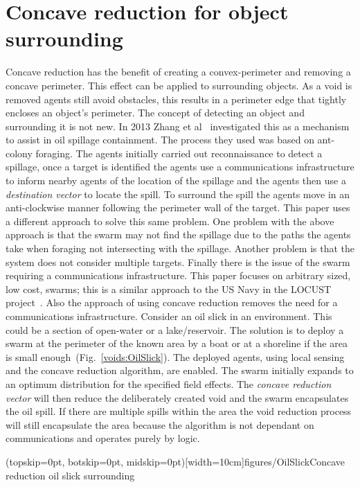 \documentclass{ieeeaccess}
\begin{document}
\section{Concave reduction for object surrounding}\label{voids:ObjectSurrounding}
Concave reduction has the benefit of creating a convex-perimeter and removing a concave perimeter. This effect can be applied to surrounding objects. As a void is removed agents still avoid obstacles, this results in a perimeter edge that tightly encloses an object's perimeter. The concept of detecting an object and surrounding it is not new. In 2013 Zhang et al~\cite{ZFG:13} investigated this as a mechanism to assist in oil spillage containment. The process they used was based on ant-colony foraging. The agents initially carried out reconnaissance to detect a spillage, once a target is identified the agents use a communications infrastructure to inform nearby agents of the location of the spillage and the agents then use a \textit{destination vector} to locate the spill. To surround the spill the agents move in an anti-clockwise manner following the perimeter wall of the target. This paper uses a different approach to solve this same problem.
One problem with the above approach is that the swarm may not find the spillage due to the paths the agents take when foraging not intersecting with the spillage. Another problem is that the system does not consider multiple targets. Finally there is the issue of the swarm requiring a communications infrastructure. 
This paper focuses on arbitrary sized, low cost, swarms; this is a similar approach to the US Navy in the LOCUST project~\cite{MW:15, DS:15}. Also the approach of using concave reduction removes the need for a communications infrastructure. 
Consider an oil slick in an environment. This could be a section of open-water or a lake/reservoir. The solution is to deploy a swarm at the perimeter of the known area by a boat or at a shoreline if the area is small enough~(Fig.~\ref{voids:OilSlick}). The deployed agents, using local sensing and the concave reduction algorithm, are enabled. The swarm initially expands to an optimum distribution for the specified field effects. The \textit{concave reduction vector} will then reduce the deliberately created void and the swarm encapsulates the oil spill. If there are multiple spills within the area the void reduction process will still encapsulate the area because the algorithm is not dependant on communications and operates purely by logic.  

\Figure[t!](topskip=0pt, botskip=0pt, midskip=0pt)[width=10cm]{figures/OilSlick}{Concave reduction oil slick surrounding\label{voids:OilSlick}}
\end{document}

